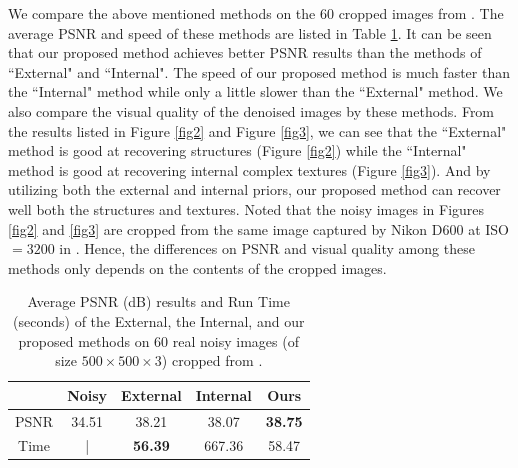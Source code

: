 \documentclass[10pt,twocolumn,letterpaper]{article}
\begin{document}
We compare the above mentioned methods on the 60 cropped images from \cite{crosschannel2016}. The average PSNR and speed of these methods are listed in Table \ref{tab1}. It can be seen that our proposed method achieves better PSNR results than the methods of ``External" and ``Internal". The speed of our proposed method is much faster than the ``Internal" method while only a little slower than the ``External" method. We also compare the visual quality of the denoised images by these methods. From the results listed in Figure \ref{fig2} and Figure \ref{fig3}, we can see that the ``External" method is good at recovering structures (Figure \ref{fig2}) while the ``Internal" method is good at recovering internal complex textures (Figure \ref{fig3}). And by utilizing both the external and internal priors, our proposed method can recover well both the structures and textures. Noted that the noisy images in Figures \ref{fig2} and \ref{fig3} are cropped from the same image captured by Nikon D600 at ISO $=3200$ in \cite{crosschannel2016}. Hence, the differences on PSNR and visual quality among these methods only depends on the contents of the cropped images.

\begin{table}
\caption{Average PSNR (dB) results and Run Time (seconds) of the External, the Internal, and our proposed methods on 60 real noisy images (of size $500\times500\times3$) cropped from \cite{crosschannel2016}.}
\label{tab1}
\vspace{-3mm}
\begin{center}
\renewcommand\arraystretch{1}
\begin{tabular}{|c||c|c|c|c|}
\hline
 & \textbf{Noisy} &\textbf{External} &\textbf{Internal} &\textbf{Ours}  
\\
\hline
PSNR & 34.51 & 38.21 & 38.07 & \textbf{38.75} 
\\
\hline
Time & | &  \textbf{56.39}  & 667.36 & 58.47
\\
\hline
\end{tabular}
\end{center}\vspace{-6mm}
\end{table}
\end{document}

